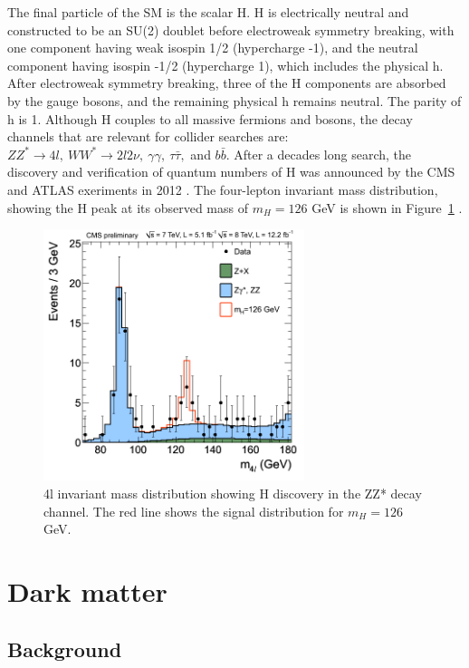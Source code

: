 \indent The final particle of the SM is the scalar H. H is electrically neutral and constructed to be an SU(2) doublet before electroweak symmetry breaking, with one component having weak isospin 1/2 (hypercharge -1), and the neutral component having isospin -1/2 (hypercharge 1), which includes the physical h. After electroweak symmetry breaking, three of the H components are absorbed by the gauge bosons, and the remaining physical h remains neutral. The parity of h is 1. Although H couples to all massive fermions and bosons, the decay channels that are relevant for collider searches are: $ZZ^* \rightarrow 4l,\  WW^* \rightarrow 2l2\nu,\  \gamma\gamma,\  \tau\bar{\tau},$ and $b\bar{b}$. After a decades long search, the discovery and verification of quantum numbers of H was announced by the CMS and ATLAS exeriments in 2012 \cite{Chatrchyan:2012xdj, Aad:2012tfa}. The four-lepton invariant mass distribution, showing the H peak at its observed mass of $m_H = 126$ GeV is shown in Figure~\ref{4l} \cite{CMS:HZZ}.

\begin{figure}[tbh]
\centering
\includegraphics[width=3in]{figures/ZZMass_7Plus8TeV_70-180_3GeV.png}
\caption{4l invariant mass distribution showing H discovery in the ZZ* decay channel. The red line shows the signal distribution for $m_H=126$ GeV.}
\label{4l}
\end{figure}


\section{Dark matter}

\subsection{Background}

